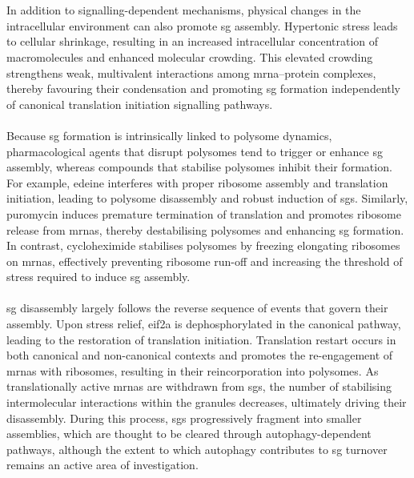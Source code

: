 \\
\\
In addition to signalling-dependent mechanisms, physical changes in the intracellular environment can also promote \gls{sg} assembly\cite{bounedjah_macromolecular_2012}. Hypertonic stress leads to cellular shrinkage, resulting in an increased intracellular concentration of macromolecules and enhanced molecular crowding\cite{bounedjah_macromolecular_2012}. This elevated crowding strengthens weak, multivalent interactions among \gls{mrna}–protein complexes, thereby favouring their condensation and promoting \gls{sg} formation independently of canonical translation initiation signalling pathways\cite{bounedjah_macromolecular_2012}.
\\
\\
Because \gls{sg} formation is intrinsically linked to polysome dynamics, pharmacological agents that disrupt polysomes tend to trigger or enhance \gls{sg} assembly, whereas compounds that stabilise polysomes inhibit their formation\cite{kedersha_mammalian_2007}. For example, edeine interferes with proper ribosome assembly and translation initiation, leading to polysome disassembly and robust induction of \glspl{sg}\cite{thomas_staufen_2005}. Similarly, puromycin induces premature termination of translation and promotes ribosome release from \glspl{mrna}, thereby destabilising polysomes and enhancing \gls{sg} formation\cite{kedersha_dynamic_2000,kedersha_mammalian_2007}. In contrast, cycloheximide stabilises polysomes by freezing elongating ribosomes on \glspl{mrna}, effectively preventing ribosome run-off and increasing the threshold of stress required to induce \gls{sg} assembly\cite{kedersha_dynamic_2000,kedersha_mammalian_2007}.
\\
\\
\gls{sg} disassembly largely follows the reverse sequence of events that govern their assembly. Upon stress relief, \gls{eif2a} is dephosphorylated in the canonical pathway, leading to the restoration of translation initiation\cite{hofmann_molecular_2021, wheeler_distinct_2016}. Translation restart occurs in both canonical and non-canonical contexts and promotes the re-engagement of \glspl{mrna} with ribosomes, resulting in their reincorporation into polysomes\cite{hofmann_molecular_2021, wheeler_distinct_2016}. As translationally active \glspl{mrna} are withdrawn from \glspl{sg}, the number of stabilising intermolecular interactions within the granules decreases, ultimately driving their disassembly\cite{hofmann_molecular_2021, wheeler_distinct_2016}. During this process, \glspl{sg} progressively fragment into smaller assemblies, which are thought to be cleared through autophagy-dependent pathways\cite{wheeler_distinct_2016}, although the extent to which autophagy contributes to \gls{sg} turnover remains an active area of investigation\cite{ganassi_surveillance_2016, marcelo_stress_2021}.
